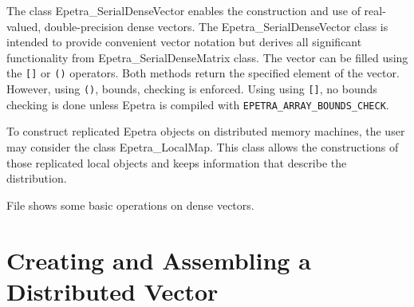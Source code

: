 The class Epetra\_SerialDenseVector enables the construction and use of
real-valued, double-precision dense vectors. The
Epetra\_SerialDenseVector class is intended to provide convenient vector
notation but derives all significant functionality from
Epetra\_SerialDenseMatrix class.  The vector can be filled using the
\verb![]! or \verb!()! operators.  Both methods return the specified
element of the vector.  However, using \verb!()!, bounds, checking is
enforced. Using using \verb![]!, no bounds checking is done unless
Epetra is compiled with \verb!EPETRA_ARRAY_BOUNDS_CHECK!.

\begin{remark}
  To construct replicated Epetra objects on distributed memory machines,
  the user may consider the class Epetra\_LocalMap. This class allows
  the constructions of those replicated local objects and keeps
  information that describe the distribution.
\end{remark}

File  shows some basic operations on dense vectors.


\section{Creating and Assembling a Distributed Vector}
\label{sec:distr_vec}

